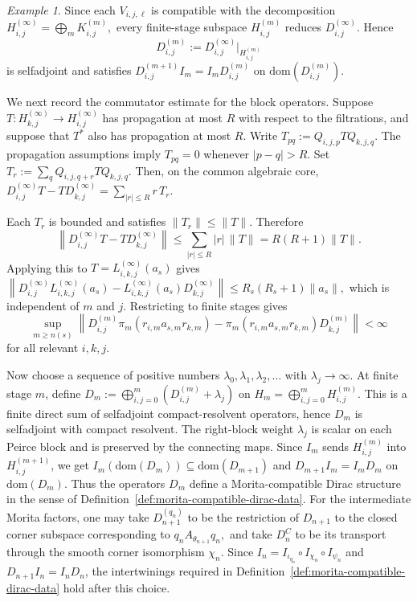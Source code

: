 \documentclass[11pt]{amsart}
\theoremstyle{definition}
\theoremstyle{remark}
\newtheorem{example}[theorem]{Example}
\newcommand{\dom}{\mathrm{dom}}
\begin{document}
\begin{example}
Since each $V_{i,j,\ell}$ is compatible with the decomposition $H_{i,j}^{(\infty)}=\bigoplus_m K_{i,j}^{(m)},$
every finite-stage subspace $H_{i,j}^{(m)}$ reduces
$D_{i,j}^{(\infty)}$. Hence
\[
D_{i,j}^{(m)}
:=
D_{i,j}^{(\infty)}\big|_{H_{i,j}^{(m)}}
\]
is selfadjoint and satisfies
$D_{i,j}^{(m+1)}I_m=I_mD_{i,j}^{(m)}$
on $\dom(D_{i,j}^{(m)})$. 

We next record the commutator estimate for the block operators. Suppose $T:H_{k,j}^{(\infty)}\to H_{i,j}^{(\infty)}$
has propagation at most $R$ with respect to the filtrations, and suppose that
$T^*$ also has propagation at most $R$. Write $T_{pq}:=Q_{i,j,p}TQ_{k,j,q}.$
The propagation assumptions imply $T_{pq}=0$
whenever $|p-q|>R.$ Set $T_r:=\sum_q Q_{i,j,q+r}TQ_{k,j,q}.$
Then, on the common algebraic core, $D_{i,j}^{(\infty)}T-TD_{k,j}^{(\infty)}=\sum_{|r|\leq R} r\,T_r.$

Each $T_r$ is bounded and satisfies $\|T_r\|\leq \|T\|.$
Therefore 
\[
\left\|
D_{i,j}^{(\infty)}T-TD_{k,j}^{(\infty)}
\right\|
\leq
\sum_{|r|\leq R}|r|\,\|T\|
=
R(R+1)\|T\|.
\]
Applying this to $T=L_{i,k,j}^{(\infty)}(a_s)$ gives
$\left\|
D_{i,j}^{(\infty)}L_{i,k,j}^{(\infty)}(a_s)-L_{i,k,j}^{(\infty)}(a_s)D_{k,j}^{(\infty)}
\right\|
\leq
R_s(R_s+1)\|a_s\|,$
which is independent of $m$ and $j$. Restricting to finite stages
gives
\[
\sup_{m\geq n(s)}
\left\|
D_{i,j}^{(m)}\pi_m(r_{i,m}a_{s,m}r_{k,m})
-
\pi_m(r_{i,m}a_{s,m}r_{k,m})D_{k,j}^{(m)}
\right\|
<\infty
\]
for all relevant $i,k,j$.


Now choose a sequence of positive numbers $\lambda_0,\lambda_1,\lambda_2,\ldots$
with $\lambda_j\to\infty.$
At finite stage $m$, define $D_m:=\bigoplus_{i,j=0}^m\left(D_{i,j}^{(m)}+\lambda_j\right)$
on $H_m=\bigoplus_{i,j=0}^m H_{i,j}^{(m)}.$ This is a finite direct sum of selfadjoint compact-resolvent operators, hence
$D_m$ is selfadjoint with compact resolvent. The right-block weight $\lambda_j$ is scalar on each Peirce block and is
preserved by the connecting maps. Since $I_m$ sends $H_{i,j}^{(m)}$ into $H_{i,j}^{(m+1)}$, we get $I_m(\dom (D_m))\subseteq\dom (D_{m+1})$ and 
$D_{m+1}I_m=I_mD_m$ on $\dom(D_m)$.
Thus the operators $D_m$ define a Morita-compatible Dirac structure in the sense of Definition~\ref{def:morita-compatible-dirac-data}. For the intermediate Morita factors, one may
take $D_{n+1}^{(q_n)}$ to be the restriction of $D_{n+1}$ to the closed
corner subspace corresponding to $q_nA_{\theta_{n+1}}q_n,$
and take $D_n^C$ to be its transport through the smooth corner isomorphism
$\chi_n$. Since $I_n=I_{\iota_{q_n}}\circ I_{\chi_n}\circ I_{\psi_n}$
and $D_{n+1}I_n=I_nD_n$, the intertwinings required in
Definition~\ref{def:morita-compatible-dirac-data} hold after this choice.


\end{example}
\end{document}
